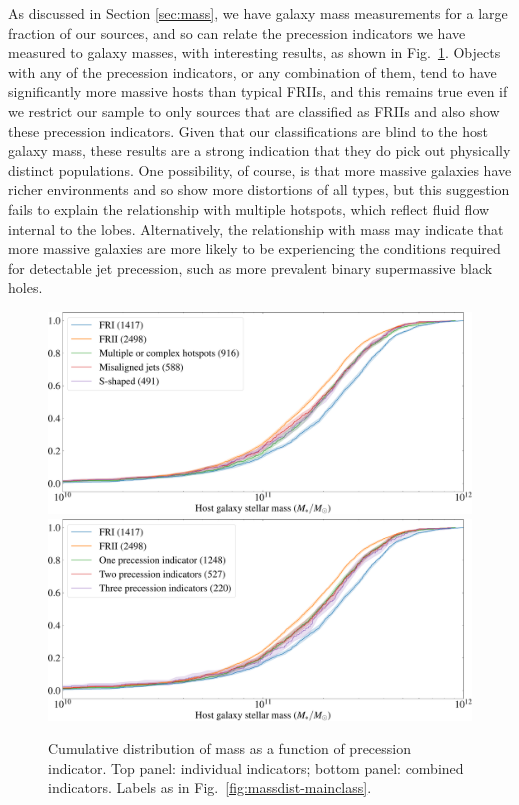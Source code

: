 \documentclass{aa}
\begin{document}
As discussed in Section \ref{sec:mass}, we have galaxy mass measurements for a large fraction of our sources, and so can relate the precession indicators we have measured to galaxy masses, with interesting results, as shown in Fig.\ \ref{fig:massdist-precess}. Objects with any of the precession indicators, or any combination of them, tend to have significantly more massive hosts than typical FRIIs, and this remains true even if we restrict our sample to only sources that are classified as FRIIs and also show these precession indicators. Given that our classifications are blind to the host galaxy mass, these results are a strong indication that they do pick out physically distinct populations. One possibility, of course, is that more massive galaxies have richer environments and so show more distortions of all types, but this suggestion fails to explain the relationship with multiple hotspots, which reflect fluid flow internal to the lobes. Alternatively, the relationship with mass may indicate that more massive galaxies are more likely to be experiencing the conditions required for detectable jet precession, such as more prevalent binary supermassive black holes.

\begin{figure}
\includegraphics[width=\linewidth]{Images/results/mass_precession2-crop.pdf}
\includegraphics[width=\linewidth]{Images/results/mass_precession-crop.pdf}
\caption{Cumulative distribution of mass as a function of precession indicator. Top panel: individual indicators; bottom panel: combined indicators. Labels as in Fig.\ \ref{fig:massdist-mainclass}.}
\label{fig:massdist-precess}
\end{figure}
\end{document}
